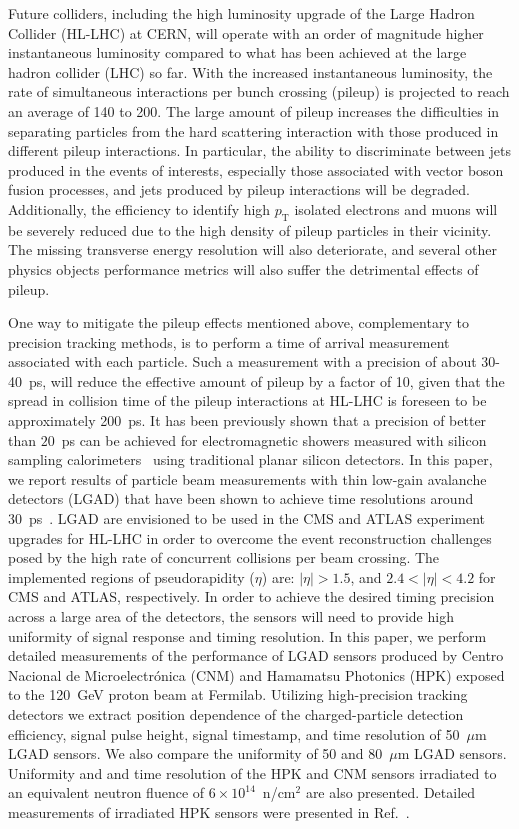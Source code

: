 \documentclass[preprint,1p]{elsarticle}
\begin{document}
Future colliders, including the high luminosity upgrade of the Large Hadron
Collider (HL-LHC) at CERN, will operate with an order of magnitude higher
instantaneous luminosity compared to what has been achieved at the
large hadron collider (LHC) so far.
With the increased instantaneous luminosity, the rate of simultaneous
interactions per bunch crossing (pileup) is projected to reach an average of 140
to 200. The large amount of pileup increases the difficulties in separating 
particles from the hard scattering interaction with those
produced in different pileup interactions. In particular, the ability to discriminate between
jets produced in the events of interests, especially those associated with vector 
boson fusion processes, and jets produced by pileup interactions will be
degraded. Additionally, the efficiency to identify high $p_{\mathrm{T}}$ isolated electrons
and muons will be severely reduced due to the high density of pileup particles
in their vicinity. The missing transverse energy resolution will also deteriorate, and several
other physics objects performance metrics will also suffer the
detrimental effects of pileup.


One way to mitigate the pileup effects mentioned above, complementary to
precision tracking methods, is to perform a time of arrival measurement
associated with each particle. Such a measurement with a precision of about
30-40~\si{ps}, will reduce the effective amount of pileup by a factor of 10,
given that the spread in collision time of the pileup interactions at HL-LHC is
foreseen to be approximately 200~\si{ps}. It has been previously shown that a
precision of better than $20$~\si{ps} can be achieved for electromagnetic
showers measured with silicon sampling
calorimeters~\cite{Apresyan201662,Apresyan2017_NSSMIC,AKCHURIN201731} using
traditional planar silicon detectors. In this paper, we report results of
particle beam measurements with thin low-gain avalanche detectors (LGAD) that
have been shown to achieve time resolutions around
30~\si{ps}~\cite{Cartiglia201783, PELLEGRINI201412}. LGAD are envisioned to be
used in the CMS and ATLAS experiment upgrades for HL-LHC in order to overcome
the event reconstruction challenges posed by the high rate of concurrent
collisions per beam crossing. The implemented regions of pseudorapidity ($\eta$)
are: $|\eta|>1.5$, and $2.4 < |\eta| < 4.2 $ for CMS and ATLAS, respectively. In
order to achieve the desired timing precision across a large area of the
detectors, the sensors will need to provide high uniformity of signal response
and timing resolution. In this paper, we perform detailed measurements of the
performance of LGAD sensors produced by Centro Nacional de Microelectr\'{o}nica
(CNM) and Hamamatsu Photonics (HPK) exposed to the 120~GeV proton beam at
Fermilab. Utilizing high-precision tracking detectors we extract position
dependence of the charged-particle detection efficiency, signal pulse height,
signal timestamp, and time resolution of 50~$\mu$m LGAD sensors. We also compare
the uniformity of 50 and 80~$\mu$m LGAD sensors. Uniformity and and time
resolution of the HPK and CNM sensors irradiated to an equivalent neutron
fluence of $6\times 10^{14}$~n/cm$^2$ are also presented. Detailed measurements
of irradiated HPK sensors were presented in Ref.~\cite{Galloway:2017gfx}.
\end{document}
